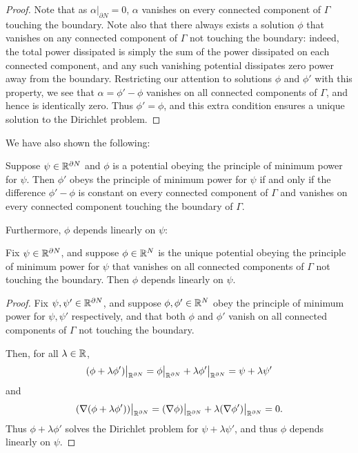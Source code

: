 \begin{proof}
Note that as $\alpha|_{\partial N} = 0$, $\alpha$ vanishes on every connected
component of $\Gamma$ touching the boundary. Note also that there always exists
a solution $\phi$ that vanishes on any connected component of $\Gamma$ not
touching the boundary: indeed, the total power dissipated is simply the sum of
the power dissipated on each connected component, and any such vanishing
potential dissipates zero power away from the boundary.  Restricting our
attention to solutions $\phi$ and $\phi'$ with this property, we see that
$\alpha = \phi'-\phi$ vanishes on all connected components of $\Gamma$, and
hence is identically zero. Thus $\phi' = \phi$, and this extra condition ensures
a unique solution to the Dirichlet problem.
\end{proof}

We have also shown the following:

\begin{proposition}\label{dirichlet_problem_2}
Suppose $\psi \in {\mathbb{R}}^{\partial N}$ and $\phi$ is a potential obeying the principle of minimum power for $\psi$.  Then $\phi'$ obeys the principle of minimum power for $\psi$ if and only if the difference $\phi' - \phi$ is constant on every connected component of $\Gamma$ and vanishes on every connected component touching the boundary of $\Gamma$.
\end{proposition}

Furthermore, $\phi$ depends linearly on $\psi$:

\begin{proposition}\label{dirichlet_problem_3: linearity}
Fix $\psi \in {\mathbb{R}}^{\partial N}$, and suppose $\phi \in {\mathbb{R}}^N$ is the unique potential obeying the principle of minimum power for $\psi$ that vanishes on all connected components of $\Gamma$ not touching the boundary. Then $\phi$ depends linearly on $\psi$.
\end{proposition}
\begin{proof}
Fix $\psi, \psi' \in {\mathbb{R}}^{\partial N}$, and suppose $\phi, \phi' \in {\mathbb{R}}^N$ obey the principle of minimum power for $\psi,\psi'$ respectively, and that both $\phi$ and $\phi'$ vanish on all connected components of $\Gamma$ not touching the boundary. 

Then, for all $\lambda \in {\mathbb{R}}$,
\[
(\phi+\lambda\phi')\big|_{{\mathbb{R}}^{\partial N}} = \phi\big|_{{\mathbb{R}}^{\partial N}} +
\lambda\phi'\big|_{{\mathbb{R}}^{\partial N}}  = \psi + \lambda\psi'
\]
and
\[
(\nabla(\phi+\lambda\phi'))\big|_{{\mathbb{R}}^{\partial N}} = 
(\nabla\phi)\big|_{{\mathbb{R}}^{\partial N}} +
\lambda(\nabla\phi')\big|_{{\mathbb{R}}^{\partial N}}  = 0.
\]
Thus $\phi+\lambda\phi'$ solves the Dirichlet problem for $\psi+\lambda\psi'$, and thus $\phi$ depends linearly on $\psi$.
\end{proof}

